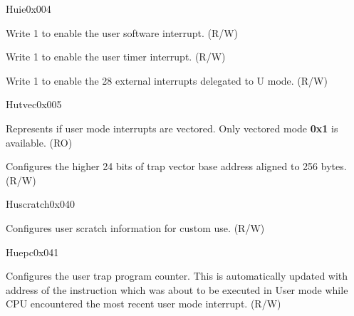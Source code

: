 \begin{register}{H}{uie}{0x004}\label{regdesc:UIE}
%
%
%
%
%
%
%
\regnewline%
\begin{regdesc}\begin{reglist}
\label{fielddesc:UIEUSIE}\item [USIE] Write 1 to enable the user software interrupt. (R/W)
\label{fielddesc:UIEUTIE}\item [UTIE] Write 1 to enable the user timer interrupt. (R/W)
\label{fielddesc:UIEUXIE}\item [UXIE] Write 1 to enable the 28 external interrupts delegated to U mode. (R/W)
\end{reglist}\end{regdesc}
\end{register}

\begin{register}{H}{utvec}{0x005}\label{regdesc:UTVEC}
%
%
%
\regnewline%
\begin{regdesc}\begin{reglist}
\label{fielddesc:UTVECMODE}\item [MODE] Represents if user mode interrupts are vectored. Only vectored mode \textbf{0x1} is available. (RO)
\label{fielddesc:UTVECBASE}\item [BASE] Configures the higher 24 bits of trap vector base address aligned to 256 bytes. (R/W)
\end{reglist}\end{regdesc}
\end{register}

\begin{register}{H}{uscratch}{0x040}\label{regdesc:USCRATCH}
%
\regnewline%
\begin{regdesc}\begin{reglist}
\label{fielddesc:USCRATCH}\item [USCRATCH] Configures user scratch information for custom use. (R/W)
\end{reglist}\end{regdesc}
\end{register}

\begin{register}{H}{uepc}{0x041}\label{regdesc:UEPC}
%
\regnewline%
\begin{regdesc}\begin{reglist}
\label{fielddesc:UEPC}\item [UEPC] Configures the user trap program counter. This is automatically updated with address of the instruction which was about to be executed in User mode while CPU encountered the most recent user mode interrupt. (R/W)
\end{reglist}\end{regdesc}
\end{register}

